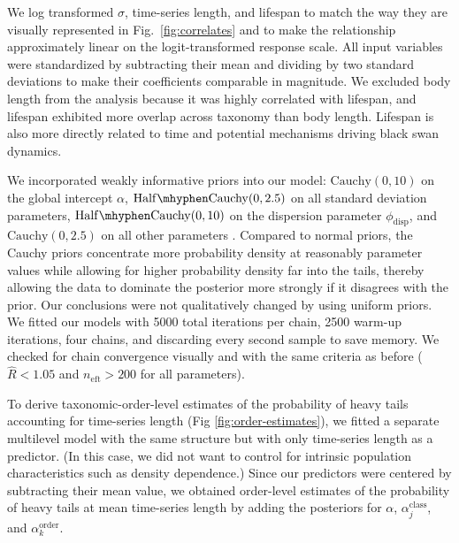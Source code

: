 We log transformed $\sigma$, time-series length, and lifespan to match the way
they are visually represented in Fig.~\ref{fig:correlates} and to make the
relationship approximately linear on the logit-transformed response scale. All
input variables were standardized by subtracting their mean and dividing by two
standard deviations \citep{gelman2008c} to make their coefficients comparable
in magnitude. We excluded body length from the analysis because it was highly
correlated with lifespan, and lifespan exhibited more overlap across taxonomy
than body length. Lifespan is also more directly related to time and potential
mechanisms driving black swan dynamics.

We incorporated weakly informative priors into our model: $\mathrm{Cauchy}(0,
10)$ on the global intercept $\alpha$, $\mathrm{Half\mhyphen Cauchy}(0, 2.5)$ on
all standard deviation parameters, $\mathrm{Half\mhyphen Cauchy}(0, 10)$ on the
dispersion parameter $\phi_\mathrm{disp}$, and $\mathrm{Cauchy}(0, 2.5)$ on all
other parameters \citep{gelman2006c, gelman2008d}. Compared to normal priors,
the Cauchy priors concentrate more probability density at reasonably parameter
values while allowing for higher probability density far into the tails, thereby
allowing the data to dominate the posterior more strongly if it disagrees with
the prior. Our conclusions were not qualitatively changed by using uniform
priors. We fitted our models with 5000 total iterations per chain, 2500 warm-up
iterations, four chains, and discarding every second sample to save memory. We
checked for chain convergence visually and with the same criteria as before
($\widehat{R} < 1.05$ and $n_\mathrm{eft} >200$ for all parameters).

To derive taxonomic-order-level estimates of the probability of heavy tails
accounting for time-series length (Fig \ref{fig:order-estimates}), we fitted
a separate multilevel model with the same structure but with only time-series
length as a predictor. (In this case, we did not want to control for intrinsic
population characteristics such as density dependence.) Since our predictors were
centered by subtracting their mean value, we obtained order-level
estimates of the probability of heavy tails at mean time-series length by
adding the posteriors for $\alpha$, $\alpha^\mathrm{class}_j$, and
$\alpha^\mathrm{order}_k$.





